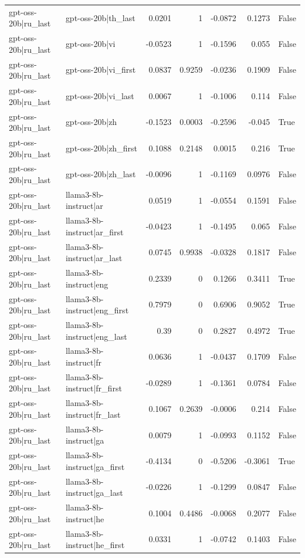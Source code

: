 \begin{table}
\begin{tabular}{l l r r r r l}
gpt-oss-20b|ru_last & gpt-oss-20b|th_last & 0.0201 & 1 & -0.0872 & 0.1273 & False \\
gpt-oss-20b|ru_last & gpt-oss-20b|vi & -0.0523 & 1 & -0.1596 & 0.055 & False \\
gpt-oss-20b|ru_last & gpt-oss-20b|vi_first & 0.0837 & 0.9259 & -0.0236 & 0.1909 & False \\
gpt-oss-20b|ru_last & gpt-oss-20b|vi_last & 0.0067 & 1 & -0.1006 & 0.114 & False \\
gpt-oss-20b|ru_last & gpt-oss-20b|zh & -0.1523 & 0.0003 & -0.2596 & -0.045 & True \\
gpt-oss-20b|ru_last & gpt-oss-20b|zh_first & 0.1088 & 0.2148 & 0.0015 & 0.216 & True \\
gpt-oss-20b|ru_last & gpt-oss-20b|zh_last & -0.0096 & 1 & -0.1169 & 0.0976 & False \\
gpt-oss-20b|ru_last & llama3-8b-instruct|ar & 0.0519 & 1 & -0.0554 & 0.1591 & False \\
gpt-oss-20b|ru_last & llama3-8b-instruct|ar_first & -0.0423 & 1 & -0.1495 & 0.065 & False \\
gpt-oss-20b|ru_last & llama3-8b-instruct|ar_last & 0.0745 & 0.9938 & -0.0328 & 0.1817 & False \\
gpt-oss-20b|ru_last & llama3-8b-instruct|eng & 0.2339 & 0 & 0.1266 & 0.3411 & True \\
gpt-oss-20b|ru_last & llama3-8b-instruct|eng_first & 0.7979 & 0 & 0.6906 & 0.9052 & True \\
gpt-oss-20b|ru_last & llama3-8b-instruct|eng_last & 0.39 & 0 & 0.2827 & 0.4972 & True \\
gpt-oss-20b|ru_last & llama3-8b-instruct|fr & 0.0636 & 1 & -0.0437 & 0.1709 & False \\
gpt-oss-20b|ru_last & llama3-8b-instruct|fr_first & -0.0289 & 1 & -0.1361 & 0.0784 & False \\
gpt-oss-20b|ru_last & llama3-8b-instruct|fr_last & 0.1067 & 0.2639 & -0.0006 & 0.214 & False \\
gpt-oss-20b|ru_last & llama3-8b-instruct|ga & 0.0079 & 1 & -0.0993 & 0.1152 & False \\
gpt-oss-20b|ru_last & llama3-8b-instruct|ga_first & -0.4134 & 0 & -0.5206 & -0.3061 & True \\
gpt-oss-20b|ru_last & llama3-8b-instruct|ga_last & -0.0226 & 1 & -0.1299 & 0.0847 & False \\
gpt-oss-20b|ru_last & llama3-8b-instruct|he & 0.1004 & 0.4486 & -0.0068 & 0.2077 & False \\
gpt-oss-20b|ru_last & llama3-8b-instruct|he_first & 0.0331 & 1 & -0.0742 & 0.1403 & False \\

\end{tabular}
\end{table}
